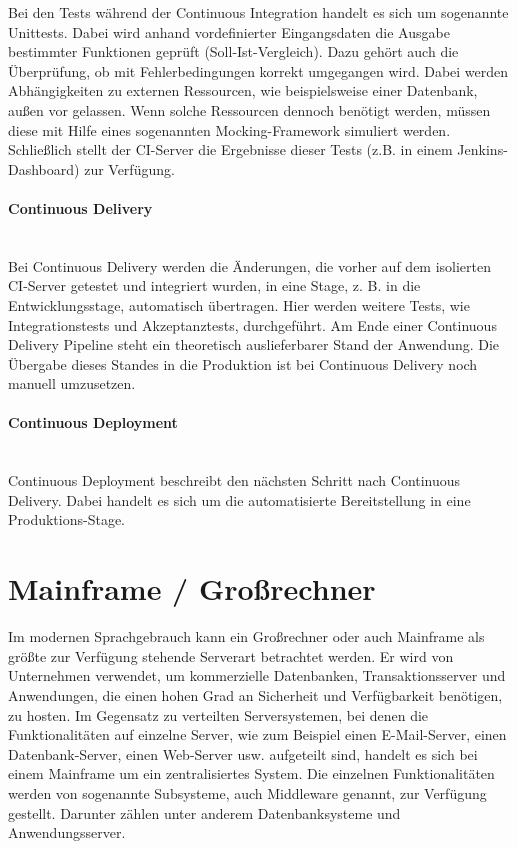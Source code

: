 Bei den Tests während der Continuous Integration handelt es sich um sogenannte \glqq Unittests\grqq.
Dabei wird anhand vordefinierter Eingangsdaten die Ausgabe bestimmter Funktionen geprüft (Soll-Ist-Vergleich).
Dazu gehört auch die Überprüfung, ob mit Fehlerbedingungen korrekt umgegangen wird.
Dabei werden Abhängigkeiten zu externen Ressourcen, wie beispielsweise einer Datenbank, außen vor gelassen.
Wenn solche Ressourcen dennoch benötigt werden, müssen diese mit Hilfe eines sogenannten \glqq Mocking-Framework\grqq{} simuliert werden.
Schließlich stellt der CI-Server die Ergebnisse dieser Tests (z.B. in einem Jenkins-Dashboard) zur Verfügung. 
\cite[Kap. 2]{Laster.2017}

\paragraph{\glqq Continuous Delivery\grqq}~\\
Bei Continuous Delivery werden die Änderungen, die vorher auf dem isolierten CI-Server getestet und integriert wurden, in eine Stage, z. B. in die Entwicklungsstage, automatisch übertragen.
Hier werden weitere Tests, wie Integrationstests und Akzeptanztests, durchgeführt.
Am Ende einer Continuous Delivery Pipeline steht ein theoretisch auslieferbarer Stand der Anwendung.
Die Übergabe dieses Standes in die Produktion ist bei Continuous Delivery noch manuell umzusetzen.
\cite[Kap. 3]{Laster.2017}

\paragraph{\glqq Continuous Deployment\grqq}~\\
Continuous Deployment beschreibt den nächsten Schritt nach Continuous Delivery.
Dabei handelt es sich um die automatisierte Bereitstellung in eine Produktions-Stage.
\cite[Kap. 4]{Laster.2017}

\section{Mainframe / Großrechner}\label{sec:mainframe}
Im modernen Sprachgebrauch kann ein Großrechner oder auch Mainframe als größte zur Verfügung stehende Serverart betrachtet werden.
Er wird von Unternehmen verwendet, um  kommerzielle Datenbanken, Transaktionsserver und Anwendungen, die einen hohen Grad an Sicherheit und Verfügbarkeit benötigen, zu hosten.
Im Gegensatz zu verteilten Serversystemen, bei denen die Funktionalitäten auf einzelne Server, wie zum Beispiel einen E-Mail-Server, einen Datenbank-Server, einen Web-Server usw. aufgeteilt sind, handelt es sich bei einem Mainframe um ein zentralisiertes System.
Die einzelnen Funktionalitäten werden von sogenannte \glqq Subsysteme\grqq, auch \glqq Middleware\grqq{} genannt, zur Verfügung gestellt. 
Darunter zählen unter anderem Datenbanksysteme und Anwendungsserver.
\cite[S. 9-10]{Ebbers.2011}

